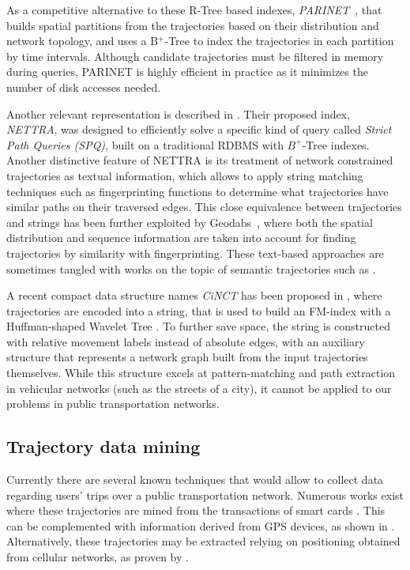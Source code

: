 \documentclass[runningheads]{llncs}
\begin{document}
As a competitive alternative to these R-Tree based indexes, {\em PARINET}~\cite{DBLP:journals/vldb/PopaZOBV11}, that builds spatial partitions from the trajectories based on their distribution and network topology, and uses a B$^+$-Tree to index the trajectories in each partition by time intervals. Although candidate trajectories must be filtered in memory during queries, PARINET is highly efficient in practice as it minimizes the number of disk accesses needed.

Another relevant representation is described in \cite{DBLP:conf/gis/KroghPTT14}. Their proposed index, {\em NETTRA}, was designed to efficiently solve a specific kind of query called {\em Strict Path Queries (SPQ)}, built on a traditional RDBMS with $B^+$-Tree indexes. Another distinctive feature of NETTRA is its treatment of network constrained trajectories as textual information, which allows to apply string matching techniques such as fingerprinting functions to determine what trajectories have similar paths on their traversed edges. This close equivalence between trajectories and strings has been further exploited by Geodabs~\cite{chapuis2018geodabs}, where both the spatial distribution and sequence information are taken into account for finding trajectories by similarity with fingerprinting. These text-based approaches are sometimes tangled with works on the topic of semantic trajectories such as \cite{al2017semantictraj}.


A recent compact data structure names {\em CiNCT} has been proposed in \cite{koide2018cinct}, where trajectories are encoded into a string, that is used to build an FM-index \cite{DBLP:conf/focs/FerraginaM00} with a Huffman-shaped Wavelet Tree \cite{ferragina2009compressed}. To further save space, the string is constructed with relative movement labels instead of absolute edges, with an auxiliary structure that represents a network graph built from the input trajectories themselves. While this structure excels at pattern-matching and path extraction in vehicular networks (such as the streets of a city), it cannot be applied to our problems in public transportation networks.

\subsection{Trajectory data mining}
Currently there are several known techniques that would allow to collect data regarding users' trips over a public transportation network. Numerous works exist where these trajectories are mined from the transactions of smart cards \cite{bhaskar2015passenger,wang2014aggregated}. This can be complemented with information derived from GPS devices, as shown in \cite{ma2014development}. Alternatively, these trajectories may be extracted relying on positioning obtained from cellular networks, as proven by \cite{liu2017exploring}. 
\end{document}
